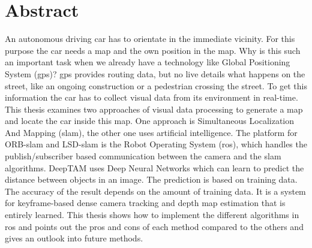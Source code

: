 

\chapter*{Abstract}
An autonomous driving car has to orientate in the immediate vicinity. For this purpose the car needs a map and the own position in the map. Why is this such an important task when we already have a technology like Global Positioning System (\gls{gps})? \gls{gps} provides routing data, but no live details what happens on the street, like an ongoing construction or a pedestrian crossing the street. To get this information the car has to collect visual data from its environment in real-time. This thesis examines two approaches of visual data processing to generate a map and locate the car inside this map. One approach is Simultaneous Localization And Mapping  (\gls{slam}), the other one uses artificial intelligence. The platform for ORB-\gls{slam} and LSD-\gls{slam} is the Robot Operating System (\gls{ros}), which handles the publish/subscriber based communication between the camera and the \gls{slam} algorithms.\newline
DeepTAM uses Deep Neural Networks which can learn to predict the distance between objects in an image. The prediction is based on training data. The accuracy of the result depends on the amount of training data. It is a system for keyframe-based dense camera tracking and depth map estimation that is entirely learned. This thesis shows how to implement the different algorithms in \gls{ros} and points out the pros and cons of each method compared to the others and gives an outlook into future methods.
\newline
\newline
\newline
\newline
